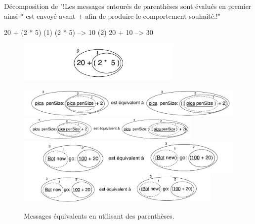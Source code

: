 \documentclass[a4paper,10pt,twoside]{book}
\begin{document}
\begin{example}[mathcorrect]{D\'ecomposition de }{}
"!Les messages entour\'es de parenth\`eses sont \'evalu\'es en premier ainsi * est envoy\'e avant + afin de produire le comportement souhait\'e.!"

    20 + (2 * 5) 
(1)        (2 * 5) --> 10
(2) 20 + 10      --> 30
\end{example}

\begin{figure}
\begin{center}
\includegraphics[width=8cm]{ucompoNumberBracket}
\end{center}
\end{figure}



\begin{figure}
\begin{center}
\ifluluelse
	{\includegraphics[width=\textwidth]{uKeyUnBinPar}}
	{\includegraphics[width=0.8\textwidth]{uKeyUnBinPar}}
\ifluluelse
	{\includegraphics[width=\textwidth]{uunKeyBinPar}}
	{\includegraphics[width=10cm]{uunKeyBinPar}}
\end{center}
\caption{Messages \'equivalents en utilisant des parenth\`eses. \label{fig:uKeyUnBinPar}}
\end{figure}
\end{document}
